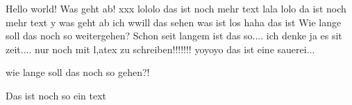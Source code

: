 \documentclass{article}
\begin{document}
Hello world! Was geht ab! xxx lololo
das ist noch mehr text
lala lolo da ist noch mehr text
y
was geht ab
ich wwill das sehen
was ist los
haha
das ist
Wie lange soll das noch so weitergehen?
Schon seit langem ist das so....
ich denke ja es sit zeit.... nur noch mit l,atex zu schreiben!!!!!!!
yoyoyo
das ist eine sauerei...


wie lange soll das noch so gehen?!

Das ist noch so ein text
\end{document}
